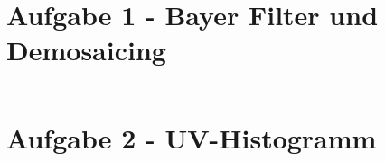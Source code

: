




\newcommand{\nr}{1}


\section*{Aufgabe 1 - Bayer Filter und Demosaicing}
\lstset{language=matlab}
\begin{lstlisting}[]
\end{lstlisting}


\section*{Aufgabe 2 - UV-Histogramm} 



